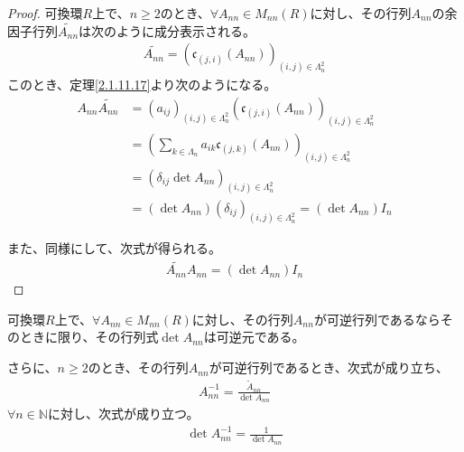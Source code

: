 \documentclass[dvipdfmx]{jsarticle}
\begin{document}
\begin{proof}
可換環$R$上で、$n \geq 2$のとき、$\forall A_{nn} \in M_{nn}(R)$に対し、その行列$A_{nn}$の余因子行列$\widetilde{A_{nn}}$は次のように成分表示される。
\begin{align*}
\widetilde{A_{nn}} = \left( \mathfrak{c}_{(j,i)}\left( A_{nn} \right) \right)_{(i,j) \in \varLambda_{n}^{2}}
\end{align*}
このとき、定理\ref{2.1.11.17}より次のようになる。
\begin{align*}
A_{nn}\widetilde{A_{nn}} &= \left( a_{ij} \right)_{(i,j) \in \varLambda_{n}^{2}}\left( \mathfrak{c}_{(j,i)}\left( A_{nn} \right) \right)_{(i,j) \in \varLambda_{n}^{2}}\\
&= \left( \sum_{k \in \varLambda_{n}} {a_{ik}\mathfrak{c}_{(j,k)}\left( A_{nn} \right)} \right)_{(i,j) \in \varLambda_{n}^{2}}\\
&= \left( \delta_{ij}\det A_{nn} \right)_{(i,j) \in \varLambda_{n}^{2}}\\
&= \left( \det A_{nn} \right)\left( \delta_{ij} \right)_{(i,j) \in \varLambda_{n}^{2}} = \left( \det A_{nn} \right)I_{n}
\end{align*}\par
また、同様にして、次式が得られる。
\begin{align*}
\widetilde{A_{nn}}A_{nn} = \left( \det A_{nn} \right)I_{n}
\end{align*}
\end{proof}
\begin{thm}\label{2.1.11.19}
可換環$R$上で、$\forall A_{nn} \in M_{nn}(R)$に対し、その行列$A_{nn}$が可逆行列であるならそのときに限り、その行列式$\det A_{nn}$は可逆元である。\par
さらに、$n \geq 2$のとき、その行列$A_{nn}$が可逆行列であるとき、次式が成り立ち、
\begin{align*}
A_{nn}^{- 1} = \frac{{\widetilde{A}}_{nn}}{\det A_{nn}}
\end{align*}
$\forall n \in \mathbb{N}$に対し、次式が成り立つ。
\begin{align*}
\det A_{nn}^{- 1} = \frac{1}{\det A_{nn}}
\end{align*}
\end{thm}
\end{document}
